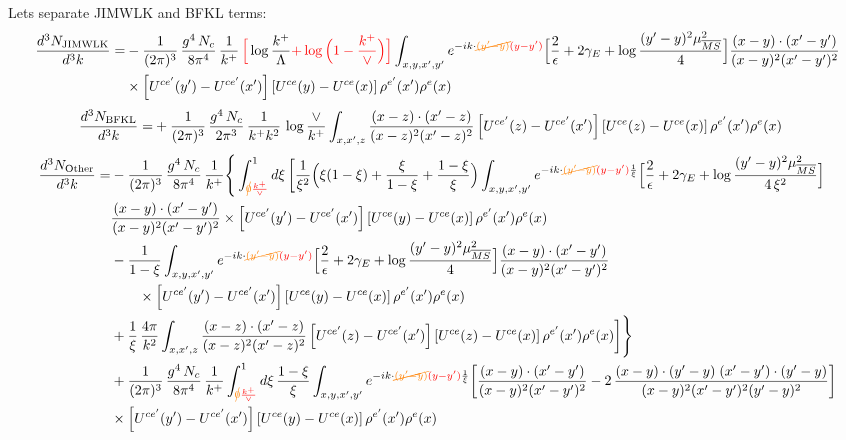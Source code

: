 \documentclass[9pt]{article}
\numberwithin{equation}{section}
\begin{document}
Lets separate JIMWLK and BFKL terms:
\begin{align}
\frac{d^{3}N_{\rm JIMWLK}}{d^{3}k}= &-\frac{1}{(2\pi)^{3}}\,\frac{g^{4}\,N_{c}}{8\pi^{4}}\,\frac{1}{k^{+}}\,{\color{red}\Big[}\log\frac{k^{+}}{\Lambda}{\color{red}+\log\Big(1-\frac{k^{+}}{\vee}\Big)\Big]}\int_{x,y,x',y'}e^{-ik\cdot{\color{orange}\cancel{(y'-y)}}{\color{red}(y-y')}}\Big[\frac{2}{\epsilon}+2\gamma_{E}+\log\frac{(y'-y)^{2}\mu^{2}_{\overline{MS}}}{4}\Big]\frac{(x-y)\cdot(x'-y')}{(x-y)^{2}(x'-y')^{2}}\notag\\
&\times\left[U^{ce'}(y') - U^{ce'}(x')\right]\left[U^{ce}(y) - U^{ce}(x)\right]\rho^{e'}(x')\rho^{e}(x)
\end{align}
\begin{align}
\frac{d^{3}N_{\rm BFKL}}{d^{3}k}= &    +\frac{1}{(2\pi)^{3}}\,\frac{g^{4}\,N_{c}}{2\pi^{3}}\,\frac{1}{k^{+}k^{2}}\,\log\frac{\vee}{k^{+}}\int_{x,x',z}\frac{(x-z)\cdot(x'-z)}{(x-z)^{2}(x'-z)^{2}}\left[U^{ce'}(z) - U^{ce'}(x')\right]\left[U^{ce}(z) - U^{ce}(x)\right]\rho^{e'}(x')\rho^{e}(x)
\end{align}
\begin{align}
\frac{d^{3}N_{\rm Other}}{d^{3}k}= &-\frac{1}{(2\pi)^{3}}\,\frac{g^{4}\,N_{c}}{8\pi^{4}}\,\frac{1}{k^{+}}\Bigg\{\int_{{\color{orange}\cancel{0}}{\color{red}\frac{k^{+}}{\vee}}}^{1}d\xi\,\bigg[\frac{1}{\xi^{2}}\Big(\xi(1-\xi)+\frac{\xi}{1-\xi}+\frac{1-\xi}{\xi}\Big)\int_{x,y,x',y'}e^{-ik\cdot{\color{orange}\cancel{(y'-y)}}{\color{red}(y-y')}\frac{1}{\xi}}\Big[\frac{2}{\epsilon}+2\gamma_{E}+\log\frac{(y'-y)^{2}\mu^{2}_{\overline{MS}}}{4\,\xi^{2}}\Big]\notag \\ & \frac{(x-y)\cdot(x'-y')}{(x-y)^{2}(x'-y')^{2}}\times\left[U^{ce'}(y') - U^{ce'}(x')\right]\left[U^{ce}(y) - U^{ce}(x)\right]\rho^{e'}(x')\rho^{e}(x)\notag\\
&-\frac{1}{1-\xi}\int_{x,y,x',y'}e^{-ik\cdot{\color{orange}\cancel{(y'-y)}}{\color{red}(y-y')}}\Big[\frac{2}{\epsilon}+2\gamma_{E}+\log\frac{(y'-y)^{2}\mu^{2}_{\overline{MS}}}{4}\Big]\frac{(x-y)\cdot(x'-y')}{(x-y)^{2}(x'-y')^{2}}\notag \\ & \qquad\times\left[U^{ce'}(y') - U^{ce'}(x')\right]\left[U^{ce}(y) - U^{ce}(x)\right]\rho^{e'}(x')\rho^{e}(x)\notag\\
&+\frac{1}{\xi}\,\frac{4\pi}{k^{2}}\int_{x,x',z}\frac{(x-z)\cdot(x'-z)}{(x-z)^{2}(x'-z)^{2}}\left[U^{ce'}(z) - U^{ce'}(x')\right]\left[U^{ce}(z) - U^{ce}(x)\right]\rho^{e'}(x')\rho^{e}(x)\bigg]\Bigg\}\notag\\
&+\frac{1}{(2\pi)^{3}}\,\frac{g^{4}\,N_{c}}{8\pi^{4}}\,\frac{1}{k^{+}}\int_{{\color{orange}\cancel{0}}{\color{red}\frac{k^{+}}{\vee}}}^{1}d\xi\,\frac{1-\xi}{\xi}\int_{x,y,x',y'}e^{-ik\cdot{\color{orange}\cancel{(y'-y)}}{\color{red}(y-y')}\frac{1}{\xi}}\bigg[\frac{(x-y)\cdot(x'-y')}{(x-y)^{2}(x'-y')^{2}}-2\,\frac{(x-y)\cdot(y'-y)\;(x'-y')\cdot(y'-y)}{(x-y)^{2}(x'-y')^{2}(y'-y)^{2}}\bigg]\notag\\
&\times\left[U^{ce'}(y') - U^{ce'}(x')\right]\left[U^{ce}(y) - U^{ce}(x)\right]\rho^{e'}(x')\rho^{e}(x)
\end{align}
\end{document}
